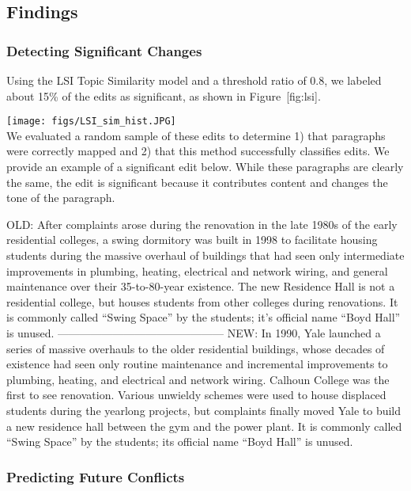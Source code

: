 \subsection{Findings}\label{findings}

\subsubsection{Detecting Significant
Changes}\label{detecting-significant-changes}

Using the LSI Topic Similarity model and a threshold ratio of 0.8, we
labeled about 15\% of the edits as significant, as shown in
Figure~{[}fig:lsi{]}.

\texttt{[image: figs/LSI\_sim\_hist.JPG]}\\

We evaluated a random sample of these edits to determine 1) that
paragraphs were correctly mapped and 2) that this method successfully
classifies edits. We provide an example of a significant edit below.
While these paragraphs are clearly the same, the edit is significant
because it contributes content and changes the tone of the paragraph.

OLD: After complaints arose during the renovation in the late 1980s of
the early residential colleges, a swing dormitory was built in 1998 to
facilitate housing students during the massive overhaul of buildings
that had seen only intermediate improvements in plumbing, heating,
electrical and network wiring, and general maintenance over their
35-to-80-year existence. The new Residence Hall is not a residential
college, but houses students from other colleges during renovations. It
is commonly called ``Swing Space'' by the students; it's official name
``Boyd Hall'' is unused. ---------------------------------------------
NEW: In 1990, Yale launched a series of massive overhauls to the older
residential buildings, whose decades of existence had seen only routine
maintenance and incremental improvements to plumbing, heating, and
electrical and network wiring. Calhoun College was the first to see
renovation. Various unwieldy schemes were used to house displaced
students during the yearlong projects, but complaints finally moved Yale
to build a new residence hall between the gym and the power plant. It is
commonly called ``Swing Space'' by the students; its official name
``Boyd Hall'' is unused.

\subsubsection{Predicting Future
Conflicts}\label{predicting-future-conflicts}

